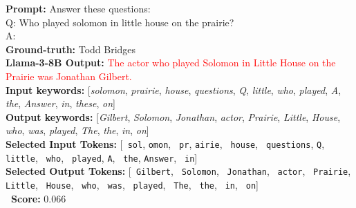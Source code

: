 \begin{tcolorbox}[breakable,title=Example from NQ, colback=gray!5!white, colframe=gray!70!black, boxrule=0.6pt, arc=2mm, left=2mm, right=2mm, top=1mm, bottom=1mm]
\footnotesize
\textbf{Prompt:} Answer these questions:
\\Q: Who played solomon in little house on the prairie?
\\A:\\[1ex]
\textbf{Ground-truth:} Todd Bridges\\
\textbf{Llama-3-8B Output:} \textcolor{red}{The actor who played Solomon in Little House on the Prairie was Jonathan Gilbert.}\\

\textbf{Input keywords:} [\textit{solomon}, \textit{prairie}, \textit{house}, \textit{questions}, \textit{Q}, \textit{little}, \textit{who}, \textit{played}, \textit{A}, \textit{the}, \textit{Answer}, \textit{in}, \textit{these}, \textit{on}]\\
\textbf{Output keywords:} [\textit{Gilbert}, \textit{Solomon}, \textit{Jonathan}, \textit{actor}, \textit{Prairie}, \textit{Little}, \textit{House}, \textit{who}, \textit{was}, \textit{played}, \textit{The}, \textit{the}, \textit{in}, \textit{on}]\\
\textbf{Selected Input Tokens:} [\texttt{ sol}, \texttt{omon}, \texttt{ pr}, \texttt{airie}, \texttt{ house}, \texttt{ questions}, \texttt{Q}, \texttt{ little}, \texttt{ who}, \texttt{ played}, \texttt{A}, \texttt{ the}, \texttt{Answer}, \texttt{ in}]\\
\textbf{Selected Output Tokens:} [\texttt{ Gilbert}, \texttt{ Solomon}, \texttt{ Jonathan}, \texttt{ actor}, \texttt{ Prairie}, \texttt{ Little}, \texttt{ House}, \texttt{ who}, \texttt{ was}, \texttt{ played}, \texttt{ The}, \texttt{ the}, \texttt{ in}, \texttt{ on}]\\


\textbf{\method~Score:} $0.066$
\end{tcolorbox}

